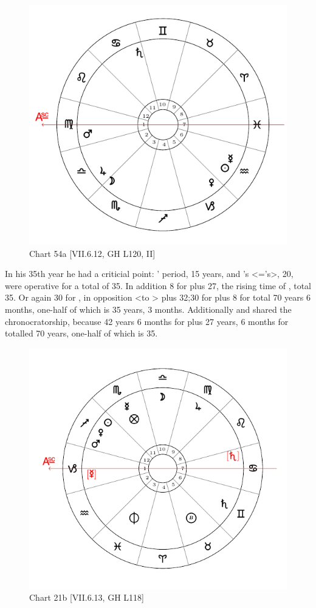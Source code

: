 \begin{figure}
\centering
\vspace{-20pt}
\includegraphics[width=.68\textwidth]{charts/5_09_1}
\caption{Chart 54a [VII.6.12, GH L120, II] }
\label{fig:chart54a}
\end{figure} 

In his 35th year he had a criticial point: \Mars’ period, 15 years, and \Virgo’s <=\Mercury’s>, 20, were operative for a total of 35. In addition 8 for \Venus\xspace plus 27, the rising time of \Capricorn, total 35. Or again 30 for \Saturn, in opposition <to \Venus>
plus 32;30 for \Cancer\xspace plus 8 for \Venus\xspace total 70 years 6 months, one-half of which is 35 years, 3 months. Additionally \Jupiter\xspace and \Saturn\xspace shared the chronocratorship, because 42 years 6 months for \Libra\xspace plus 27 years, 6 months for \Cancer\xspace totalled 70 years, one-half of which is 35.

\newpage
\begin{figure}
\centering
\vspace{0pt}
\includegraphics[width=.68\textwidth]{charts/2_36_2}
\caption{Chart 21b [VII.6.13, GH L118] }
\label{fig:chart21b}
\end{figure} 

